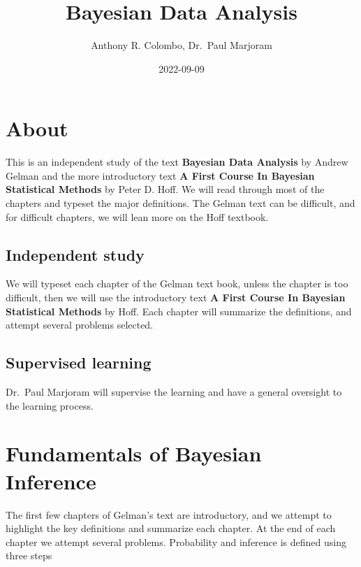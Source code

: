 \documentclass[
]{book}
\title{Bayesian Data Analysis}
\author{Anthony R. Colombo, Dr.~Paul Marjoram}
\date{2022-09-09}
\theoremstyle{definition}
\theoremstyle{definition}
\theoremstyle{definition}
\theoremstyle{definition}
\theoremstyle{remark}
\begin{document}
\maketitle

{
\setcounter{tocdepth}{1}
\tableofcontents
}
\hypertarget{about}{%
\chapter*{About}\label{about}}

This is an independent study of the text \textbf{Bayesian Data Analysis} by Andrew Gelman and the more introductory text \textbf{A First Course In Bayesian Statistical Methods} by Peter D. Hoff. We will read through most of the chapters and typeset the major definitions. The Gelman text can be difficult, and for difficult chapters, we will lean more on the Hoff textbook.

\hypertarget{independent-study}{%
\section*{Independent study}\label{independent-study}}

We will typeset each chapter of the Gelman text book, unless the chapter is too difficult, then we will use the introductory text \textbf{A First Course In Bayesian Statistical Methods} by Hoff. Each chapter will summarize the definitions, and attempt several problems selected.

\hypertarget{supervised-learning}{%
\section*{Supervised learning}\label{supervised-learning}}

Dr.~Paul Marjoram will supervise the learning and have a general oversight to the learning process.

\hypertarget{fundamentals-of-bayesian-inference}{%
\chapter{Fundamentals of Bayesian Inference}\label{fundamentals-of-bayesian-inference}}

The first few chapters of Gelman's text are introductory, and we attempt to highlight the key definitions and summarize each chapter. At the end of each chapter we attempt several problems. Probability and inference is defined using three steps
\end{document}
